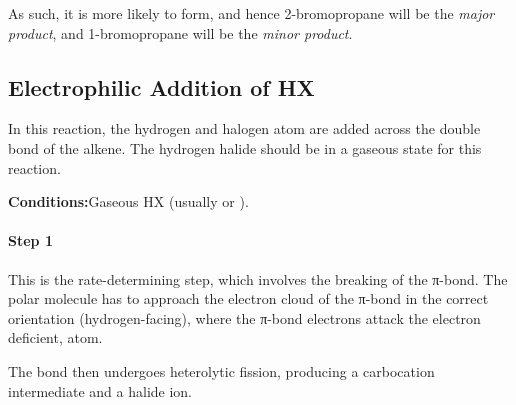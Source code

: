 				As such, it is more likely to form, and hence 2-bromopropane will be the \textit{major product}, and
				1-bromopropane will be the \textit{minor product}.






		\pagebreak
		\subsection{Electrophilic Addition of HX}

			In this reaction, the hydrogen and halogen atom are added across the double bond of the alkene. The hydrogen halide
			should be in a gaseous state for this reaction.

			\vspace{1.5em}
			\vbox{\textbf{Conditions:}\tabto{35mm}Gaseous HX (usually  or ).}

			\paragraph{Step 1}



			This is the rate-determining step, which involves the breaking of the π-bond. The polar  molecule has to
			approach the electron cloud of the π-bond in the correct orientation (hydrogen-facing), where the π-bond electrons
			attack the electron deficient,  atom.

			The  bond then undergoes heterolytic fission, producing a carbocation intermediate and a halide ion.


